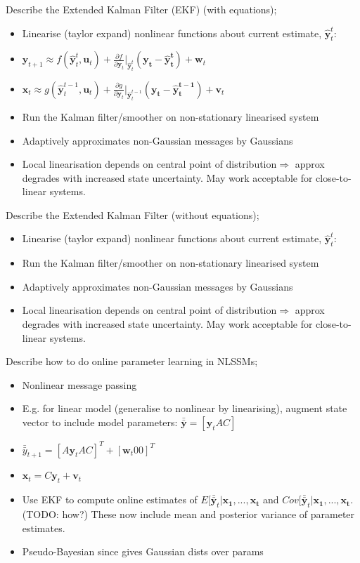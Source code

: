 \documentclass{article}
\begin{document}
Describe the Extended Kalman Filter (EKF) (with equations); \begin{itemize} \item Linearise (taylor expand) nonlinear functions about current estimate, $\mathbf{\hat{y}}^t_t$: \item $\mathbf{y}_{t+1}\approx f(\mathbf{\hat{y}}^t_t, \mathbf{u}_t) + \frac{\partial f}{\partial \mathbf{y}_t}|_{\hat{\mathbf{y}}^t_t}(\mathbf{y_t-\hat{y}^t_t})+\mathbf{w}_t$ \item $\mathbf{x}_{t}\approx g(\mathbf{\hat{y}}^{t-1}_t, \mathbf{u}_t) + \frac{\partial g}{\partial \mathbf{y}_t}|_{\hat{\mathbf{y}}^{t-1}_t}(\mathbf{y_t-\hat{y}^{t-1}_t})+\mathbf{v}_t$ \item Run the Kalman filter/smoother on non-stationary linearised system \item Adaptively approximates non-Gaussian messages by Gaussians \item Local linearisation depends on central point of distribution$\Rightarrow$ approx degrades with increased state uncertainty. May work acceptable for close-to-linear systems. \end{itemize}

Describe the Extended Kalman Filter (without equations); \begin{itemize} \item Linearise (taylor expand) nonlinear functions about current estimate, $\mathbf{\hat{y}}^t_t$: \item Run the Kalman filter/smoother on non-stationary linearised system \item Adaptively approximates non-Gaussian messages by Gaussians \item Local linearisation depends on central point of distribution$\Rightarrow$ approx degrades with increased state uncertainty. May work acceptable for close-to-linear systems. \end{itemize}

Describe how to do online parameter learning in NLSSMs; \begin{itemize} \item Nonlinear message passing \item E.g. for linear model (generalise to nonlinear by linearising), augment state vector to include model parameters: $\bar{\bar{\mathbf{y}}}=[\mathbf{y}_t A C]$ \item $\bar{\bar{y}}_{t+1}=[A\mathbf{y}_t A C]^T + [\mathbf{w}_t 0 0 ]^T$ \item $\mathbf{x}_t=C\mathbf{y}_t+\mathbf{v}_t$ \item Use EKF to compute online estimates of $E[\bar{\bar{\mathbf{y}}}_t|\mathbf{x_1,...,x_t}$ and $Cov[\bar{\bar{\mathbf{y}}}_t|\mathbf{x_1,...,x_t}$. (TODO: how?) These now include mean and posterior variance of parameter estimates. \item Pseudo-Bayesian since gives Gaussian dists over params \end{itemize}
\end{document}
